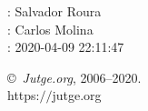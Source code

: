 \documentclass[11pt]{article}
\begin{document}
    \newcommand{\SampleTwoCol}{\SampleTwoColInputOutput{sample}{}}
    \newcommand{\SampleOneCol}{\SampleOneColInputOutput{sample}{}}

    \ProblemInformation
    \Author: Salvador Roura\\    \Translator: Carlos Molina\\
    \Generation: 2020-04-09 22:11:47

    \bigskip

    \copyright\ \emph{Jutge.org}, 2006--2020. \\
    https:$/\!\!/$jutge.org
\end{document}
